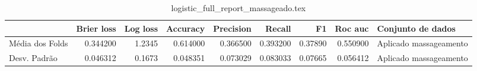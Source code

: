 \begin{table}
\centering
\caption{logistic_full_report_massageado.tex}
\label{logistic_full_report_massageado.tex}
\begin{tabular}{lrrrrrrrl}
\toprule
{} &  Brier  loss &  Log loss &  Accuracy  &  Precision  &   Recall  &      F1  &  Roc auc  &       Conjunto de dados \\
\midrule
Média dos Folds &     0.344200 &    1.2345 &   0.614000 &    0.366500 &  0.393200 &  0.37890 &  0.550900 &  Aplicado massageamento \\
Desv. Padrão    &     0.046312 &    0.1673 &   0.048351 &    0.073029 &  0.083033 &  0.07665 &  0.056412 &  Aplicado massageamento \\
\bottomrule
\end{tabular}
\end{table}
